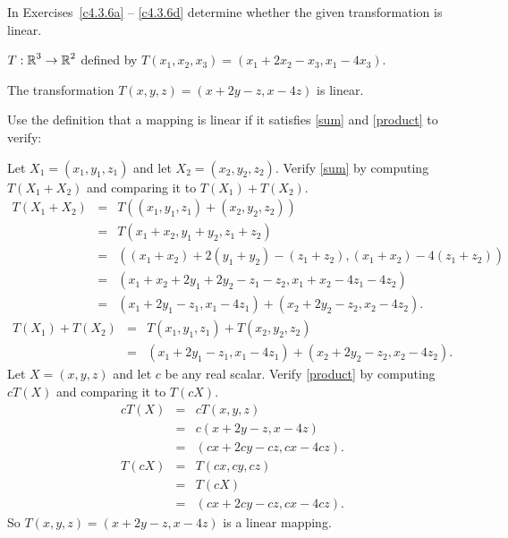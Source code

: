 \documentclass{ximera}
\begin{document}
\noindent In Exercises~\ref{c4.3.6a} -- \ref{c4.3.6d} determine
whether the given transformation is linear.
\begin{exercise} \label{c4.3.6a}
  $T:\mbox{$\Bbb{R}$}^3\to\mbox{$\Bbb{R}$}^2$ defined by $T(x_1,x_2,x_3)=(x_1+2x_2-x_3,x_1-4x_3)$.

\begin{solution}
\ans The transformation $T(x,y,z) = (x + 2y - z, x - 4z)$
is linear.

\soln Use the definition that a mapping is linear if it satisfies
\eqref{sum} and \eqref{product} to verify:

\para Let $X_1 = (x_1,y_1,z_1)$ and let $X_2 = (x_2,y_2,z_2)$.
Verify \eqref{sum} by computing $T(X_1 + X_2)$ and comparing it
to $T(X_1) + T(X_2)$.
\[ \begin{array}{rcl}
T(X_1 + X_2) & = & T((x_1,y_1,z_1) + (x_2, y_2, z_2)) \\
& = & T(x_1 + x_2, y_1 + y_2, z_1 + z_2) \\
& = & ((x_1 + x_2) + 2(y_1 + y_2) - (z_1 + z_2),
(x_1 + x_2) - 4(z_1 + z_2)) \\ & = &
(x_1 + x_2 + 2y_1 + 2y_2 - z_1 - z_2, x_1 + x_2 - 4z_1 - 4z_2) \\
& = & (x_1 + 2y_1 - z_1, x_1 - 4z_1) +
(x_2 + 2y_2 - z_2, x_2 - 4z_2). \end{array} \]
\[ \begin{array}{rcl}
T(X_1) + T(X_2)
& = & T(x_1,y_1,z_1) + T(x_2,y_2,z_2) \\
& = & (x_1 + 2y_1 - z_1, x_1 - 4z_1) +
(x_2 + 2y_2 - z_2, x_2 - 4z_2). \end{array} \]
Let $X = (x,y,z)$ and let $c$ be any real scalar.  Verify
\eqref{product} by computing $cT(X)$ and comparing it to $T(cX)$.
\[ \begin{array}{rcl}
cT(X) & = & cT(x,y,z) \\
& = & c(x + 2y - z, x - 4z) \\
& = & (cx + 2cy - cz, cx - 4cz). \end{array} \]
\[ \begin{array}{rcl}
T(cX) & = & T(cx,cy,cz) \\
& = & T(cX) \\
& = & (cx + 2cy - cz, cx - 4cz). \end{array} \]
So $T(x,y,z) = (x + 2y - z, x - 4z)$ is a linear mapping.

\end{solution}
\end{exercise}
\end{document}
